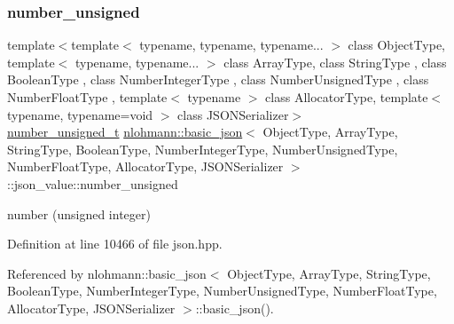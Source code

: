 \mbox{\label{unionnlohmann_1_1basic__json_1_1json__value_a0299a6aa3bc4d45d54130e52970f73d3}} 
\subsubsection{\texorpdfstring{number\+\_\+unsigned}{number\_unsigned}}
{\footnotesize\ttfamily template$<$template$<$ typename, typename, typename... $>$ class Object\+Type, template$<$ typename, typename... $>$ class Array\+Type, class String\+Type , class Boolean\+Type , class Number\+Integer\+Type , class Number\+Unsigned\+Type , class Number\+Float\+Type , template$<$ typename $>$ class Allocator\+Type, template$<$ typename, typename=void $>$ class J\+S\+O\+N\+Serializer$>$ \\
\hyperlink{classnlohmann_1_1basic__json_ab906e29b5d83ac162e823ada2156b989}{number\+\_\+unsigned\+\_\+t} \hyperlink{classnlohmann_1_1basic__json}{nlohmann\+::basic\+\_\+json}$<$ Object\+Type, Array\+Type, String\+Type, Boolean\+Type, Number\+Integer\+Type, Number\+Unsigned\+Type, Number\+Float\+Type, Allocator\+Type, J\+S\+O\+N\+Serializer $>$\+::json\+\_\+value\+::number\+\_\+unsigned}



number (unsigned integer) 



Definition at line 10466 of file json.\+hpp.



Referenced by nlohmann\+::basic\+\_\+json$<$ Object\+Type, Array\+Type, String\+Type, Boolean\+Type, Number\+Integer\+Type, Number\+Unsigned\+Type, Number\+Float\+Type, Allocator\+Type, J\+S\+O\+N\+Serializer $>$\+::basic\+\_\+json().

\mbox{\label{unionnlohmann_1_1basic__json_1_1json__value_a4a2209bb26e7088cd36bf24824ab5521}} 
